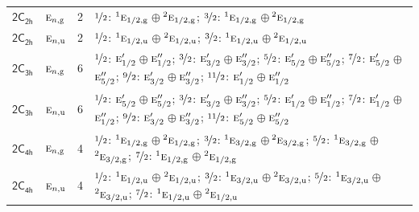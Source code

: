 \documentclass[10pt,a4paper]{article}
\numberwithin{equation}{section}
\newcommand{\grp}[1]{\mathsf{#1}}
\newcommand{\irr}[1]{\text{\normalfont\scshape #1}}
\newcommand{\conjpair}[1]{{}^{#1}}
\newcommand{\ptag}[1]{\mathrm{#1}}
\newlength{\fillwidth}\newlength{\cellwidth}\newlength{\colwidth}
\begin{document}
{\begin{longtable}{@{}llr>{\RaggedRight\arraybackslash}p{\fillwidth}@{}}
\href{2C2h.pdf}{$\grp{2C_{2h}}$} & $\irr{e}_{n,\ptag{g}}$ & 2 & $\nicefrac{1}{2}$: $\conjpair{1}\irr{e}_{1/2,\ptag{g}}$${}\oplus{}$$\conjpair{2}\irr{e}_{1/2,\ptag{g}}$; $\nicefrac{3}{2}$: $\conjpair{1}\irr{e}_{1/2,\ptag{g}}$${}\oplus{}$$\conjpair{2}\irr{e}_{1/2,\ptag{g}}$\\
\href{2C2h.pdf}{$\grp{2C_{2h}}$} & $\irr{e}_{n,\ptag{u}}$ & 2 & $\nicefrac{1}{2}$: $\conjpair{1}\irr{e}_{1/2,\ptag{u}}$${}\oplus{}$$\conjpair{2}\irr{e}_{1/2,\ptag{u}}$; $\nicefrac{3}{2}$: $\conjpair{1}\irr{e}_{1/2,\ptag{u}}$${}\oplus{}$$\conjpair{2}\irr{e}_{1/2,\ptag{u}}$\\
\href{2C3h.pdf}{$\grp{2C_{3h}}$} & $\irr{e}_{n,\ptag{g}}$ & 6 & $\nicefrac{1}{2}$: $\irr{e}_{1/2}'$${}\oplus{}$$\irr{e}_{1/2}''$; $\nicefrac{3}{2}$: $\irr{e}_{3/2}'$${}\oplus{}$$\irr{e}_{3/2}''$; $\nicefrac{5}{2}$: $\irr{e}_{5/2}'$${}\oplus{}$$\irr{e}_{5/2}''$; $\nicefrac{7}{2}$: $\irr{e}_{5/2}'$${}\oplus{}$$\irr{e}_{5/2}''$; $\nicefrac{9}{2}$: $\irr{e}_{3/2}'$${}\oplus{}$$\irr{e}_{3/2}''$; $\nicefrac{11}{2}$: $\irr{e}_{1/2}'$${}\oplus{}$$\irr{e}_{1/2}''$\\
\href{2C3h.pdf}{$\grp{2C_{3h}}$} & $\irr{e}_{n,\ptag{u}}$ & 6 & $\nicefrac{1}{2}$: $\irr{e}_{5/2}'$${}\oplus{}$$\irr{e}_{5/2}''$; $\nicefrac{3}{2}$: $\irr{e}_{3/2}'$${}\oplus{}$$\irr{e}_{3/2}''$; $\nicefrac{5}{2}$: $\irr{e}_{1/2}'$${}\oplus{}$$\irr{e}_{1/2}''$; $\nicefrac{7}{2}$: $\irr{e}_{1/2}'$${}\oplus{}$$\irr{e}_{1/2}''$; $\nicefrac{9}{2}$: $\irr{e}_{3/2}'$${}\oplus{}$$\irr{e}_{3/2}''$; $\nicefrac{11}{2}$: $\irr{e}_{5/2}'$${}\oplus{}$$\irr{e}_{5/2}''$\\
\href{2C4h.pdf}{$\grp{2C_{4h}}$} & $\irr{e}_{n,\ptag{g}}$ & 4 & $\nicefrac{1}{2}$: $\conjpair{1}\irr{e}_{1/2,\ptag{g}}$${}\oplus{}$$\conjpair{2}\irr{e}_{1/2,\ptag{g}}$; $\nicefrac{3}{2}$: $\conjpair{1}\irr{e}_{3/2,\ptag{g}}$${}\oplus{}$$\conjpair{2}\irr{e}_{3/2,\ptag{g}}$; $\nicefrac{5}{2}$: $\conjpair{1}\irr{e}_{3/2,\ptag{g}}$${}\oplus{}$$\conjpair{2}\irr{e}_{3/2,\ptag{g}}$; $\nicefrac{7}{2}$: $\conjpair{1}\irr{e}_{1/2,\ptag{g}}$${}\oplus{}$$\conjpair{2}\irr{e}_{1/2,\ptag{g}}$\\
\href{2C4h.pdf}{$\grp{2C_{4h}}$} & $\irr{e}_{n,\ptag{u}}$ & 4 & $\nicefrac{1}{2}$: $\conjpair{1}\irr{e}_{1/2,\ptag{u}}$${}\oplus{}$$\conjpair{2}\irr{e}_{1/2,\ptag{u}}$; $\nicefrac{3}{2}$: $\conjpair{1}\irr{e}_{3/2,\ptag{u}}$${}\oplus{}$$\conjpair{2}\irr{e}_{3/2,\ptag{u}}$; $\nicefrac{5}{2}$: $\conjpair{1}\irr{e}_{3/2,\ptag{u}}$${}\oplus{}$$\conjpair{2}\irr{e}_{3/2,\ptag{u}}$; $\nicefrac{7}{2}$: $\conjpair{1}\irr{e}_{1/2,\ptag{u}}$${}\oplus{}$$\conjpair{2}\irr{e}_{1/2,\ptag{u}}$\\

\end{longtable}}
\end{document}
